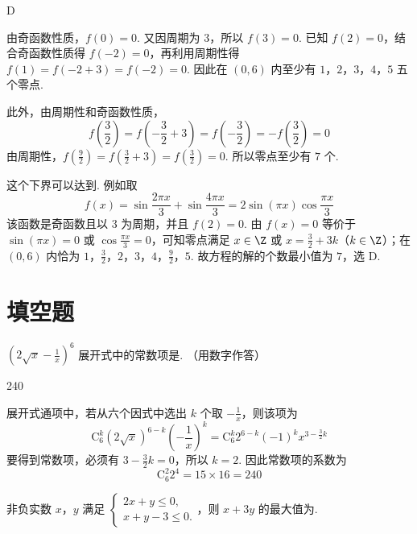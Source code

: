 \begin{answer}
D
\end{answer}

\begin{solution}
由奇函数性质，\(f(0)=0\). 又因周期为 \(3\)，所以 \(f(3)=0\). 已知 \(f(2)=0\)，结合奇函数性质得 \(f(-2)=0\)，再利用周期性得 \(f(1)=f(-2+3)=f(-2)=0\). 因此在 \((0,6)\) 内至少有 \(1\)，\(2\)，\(3\)，\(4\)，\(5\) 五个零点.

此外，由周期性和奇函数性质，
\[
f\left(\frac{3}{2}\right)=f\left(-\frac{3}{2}+3\right)=f\left(-\frac{3}{2}\right)=-f\left(\frac{3}{2}\right)=0
\]
由周期性，\(f\left(\frac{9}{2}\right)=f\left(\frac{3}{2}+3\right)=f\left(\frac{3}{2}\right)=0\). 所以零点至少有 \(7\) 个.

这个下界可以达到. 例如取
\[
f(x)=\sin\frac{2\pi x}{3}+\sin\frac{4\pi x}{3}=2\sin(\pi x)\cos\frac{\pi x}{3}
\]
该函数是奇函数且以 \(3\) 为周期，并且 \(f(2)=0\). 由 \(f(x)=0\) 等价于 \(\sin(\pi x)=0\) 或 \(\cos\frac{\pi x}{3}=0\)，可知零点满足 \(x\in\Z\) 或 \(x=\frac{3}{2}+3k\)（\(k\in\Z\)）；在 \((0,6)\) 内恰为 \(1\)，\(\frac{3}{2}\)，\(2\)，\(3\)，\(4\)，\(\frac{9}{2}\)，\(5\). 故方程的解的个数最小值为 \(7\)，选 D.
\end{solution}



\section{填空题}

\begin{problem}
\(\left(2\sqrt{x} - \frac{1}{x}\right)^6\) 展开式中的常数项是\fillinblank{}. （用数字作答）
\end{problem}

\begin{answer}
240
\end{answer}

\begin{solution}
展开式通项中，若从六个因式中选出 \(k\) 个取 \(-\frac{1}{x}\)，则该项为
\[
\mathrm C_6^k\left(2\sqrt{x}\right)^{6-k}\left(-\frac{1}{x}\right)^k
=\mathrm C_6^k2^{6-k}(-1)^k x^{3-\frac{3}{2}k}
\]
要得到常数项，必须有 \(3-\frac{3}{2}k=0\)，所以 \(k=2\). 因此常数项的系数为
\[
\mathrm C_6^2 2^4=15\times16=240
\]
\end{solution}



\begin{problem}
非负实数 \(x\)，\(y\) 满足 \(\begin{cases}
2x + y \leqslant 0,\\
x + y - 3 \leqslant 0.
\end{cases}\)，则 \(x + 3y\) 的最大值为\fillinblank{}.
\end{problem}


